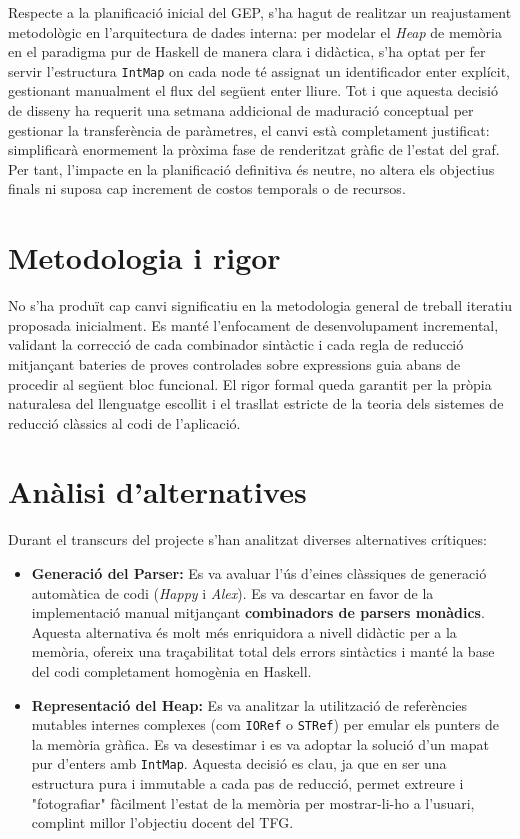 \documentclass[12pt,a4paper]{article}
\begin{document}
Respecte a la planificació inicial del GEP, s'ha hagut de realitzar un reajustament metodològic en l'arquitectura de dades interna: per modelar el \textit{Heap} de memòria en el paradigma pur de Haskell de manera clara i didàctica, s'ha optat per fer servir l'estructura \texttt{IntMap} on cada node té assignat un identificador enter explícit, gestionant manualment el flux del següent enter lliure. Tot i que aquesta decisió de disseny ha requerit una setmana addicional de maduració conceptual per gestionar la transferència de paràmetres, el canvi està completament justificat: simplificarà enormement la pròxima fase de renderitzat gràfic de l'estat del graf. Per tant, l'impacte en la planificació definitiva és neutre, no altera els objectius finals ni suposa cap increment de costos temporals o de recursos.

\section{Metodologia i rigor}
No s'ha produït cap canvi significatiu en la metodologia general de treball iteratiu proposada inicialment. Es manté l'enfocament de desenvolupament incremental, validant la correcció de cada combinador sintàctic i cada regla de reducció mitjançant bateries de proves controlades sobre expressions guia abans de procedir al següent bloc funcional. El rigor formal queda garantit per la pròpia naturalesa del llenguatge escollit i el trasllat estricte de la teoria dels sistemes de reducció clàssics al codi de l'aplicació.

\section{Anàlisi d'alternatives}
Durant el transcurs del projecte s'han analitzat diverses alternatives crítiques:
\begin{itemize}[leftmargin=*]
    \item \textbf{Generació del Parser:} Es va avaluar l'ús d'eines clàssiques de generació automàtica de codi (\textit{Happy} i \textit{Alex}). Es va descartar en favor de la implementació manual mitjançant \textbf{combinadors de parsers monàdics}. Aquesta alternativa és molt més enriquidora a nivell didàctic per a la memòria, ofereix una traçabilitat total dels errors sintàctics i manté la base del codi completament homogènia en Haskell.
    \item \textbf{Representació del Heap:} Es va analitzar la utilització de referències mutables internes complexes (com \texttt{IORef} o \texttt{STRef}) per emular els punters de la memòria gràfica. Es va desestimar i es va adoptar la solució d'un mapat pur d'enters amb \texttt{IntMap}. Aquesta decisió es clau, ja que en ser una estructura pura i immutable a cada pas de reducció, permet extreure i "fotografiar" fàcilment l'estat de la memòria per mostrar-li-ho a l'usuari, complint millor l'objectiu docent del TFG.
\end{itemize}
\end{document}
